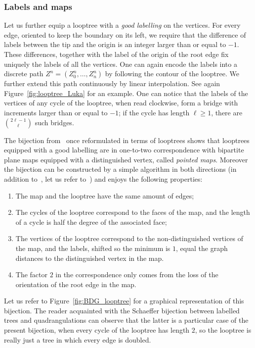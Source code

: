 \documentclass[british, a4paper,11pt]{article}
\numberwithin{equation}{section}
\theoremstyle{definition}
\begin{document}
\subsubsection*{Labels and maps}

Let us further equip a looptree with a \emph{good labelling} on the vertices.
For every edge, oriented to keep the boundary on its left, we require that the difference of labels between the tip and the origin is an integer larger than or equal to $-1$. 
These differences, together with the label of the origin of the root edge fix uniquely the labels of all the vertices.
One can again encode the labels into a discrete path $Z^n = (Z^n_0, \dots, Z^n_n)$ by following the contour of the looptree. We further extend this path continuously by linear interpolation. See again Figure~\ref{fig:looptree_Luka} for an example.
One can notice that the labels of the vertices of any cycle of the looptree, when read clockwise, form a bridge with increments larger than or equal to $-1$; if the cycle has length $\ell \geq 1$, there are $\binom{2\ell-1}{\ell}$ such bridges.


The bijection from~\cite[Section~2]{BDG04} once reformulated in terms of looptrees shows that looptrees equipped with a good labelling are in one-to-two correspondence with bipartite plane maps equipped with a distinguished vertex, called \emph{pointed maps}. Moreover the bijection can be constructed by a simple algorithm in both directions (in addition to~\cite{BDG04}, let us refer to~\cite[Section~2.2]{Mar24}) and enjoys the following properties:
\begin{enumerate}
\item The map and the looptree have the same amount of edges;
\item The cycles of the looptree correspond to the faces of the map, and the length of a cycle is half the degree of the associated face;
\item The vertices of the looptree correspond to the non-distinguished vertices of the map, and the labels, 
shifted so the minimum is $1$,
equal the graph distances to the distinguished vertex in the map.
\item The factor $2$ in the correspondence only comes from the loss of the orientation of the root edge in the map.
\end{enumerate}
Let us refer to Figure~\ref{fig:BDG_looptree} for a graphical representation of this bijection.
The reader acquainted with the Schaeffer bijection between labelled trees and quadrangulations can observe that the latter is a particular case of the present bijection, when every cycle of the looptree has length $2$, so the looptree is really just a tree in which every edge is doubled.
\end{document}

